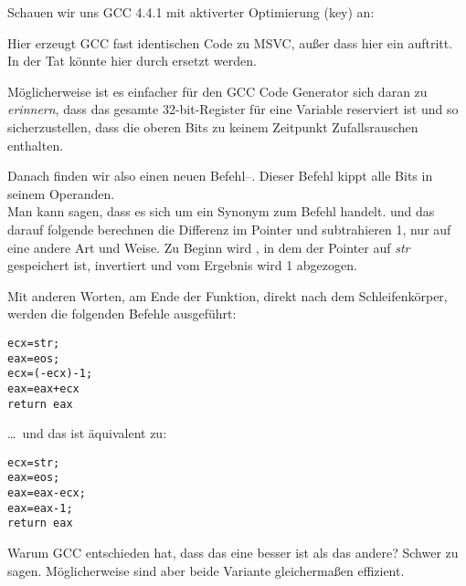 Schauen wir uns GCC 4.4.1 mit aktiverter Optimierung (\Othree key) an:


 
Hier erzeugt GCC fast identischen Code zu MSVC, außer dass hier ein \MOVZX
auftritt. 
In der Tat könnte \MOVZX hier durch  ersetzt werden.
 
Möglicherweise ist es einfacher für den GCC Code Generator sich daran zu
\emph{erinnern}, dass das gesamte 32-bit-\EDX Register für eine \Tchar Variable
reserviert ist und so sicherzustellen, dass die oberen Bits zu keinem Zeitpunkt
Zufallsrauschen enthalten.

\label{strlen_NOT_ADD}

Danach finden wir also einen neuen Befehl--\NOT. Dieser Befehl kippt alle Bits
in seinem Operanden.\\
Man kann sagen, dass es sich um ein Synonym zum Befehl 
handelt. 
\NOT und das darauf folgende \ADD berechnen die Differenz im Pointer und
subtrahieren 1, nur auf eine andere Art und Weise. 
Zu Beginn wird \ECX, in dem der Pointer auf \emph{str} gespeichert ist, invertiert
und vom Ergebnis wird 1 abgezogen.

Mit anderen Worten, am Ende der Funktion, direkt nach dem Schleifenkörper,
werden die folgenden Befehle ausgeführt:

\begin{lstlisting}[style=customc]
ecx=str;
eax=eos;
ecx=(-ecx)-1; 
eax=eax+ecx
return eax
\end{lstlisting}

\dots~und das ist äquivalent zu:

\begin{lstlisting}[style=customc]
ecx=str;
eax=eos;
eax=eax-ecx;
eax=eax-1;
return eax
\end{lstlisting}

Warum GCC entschieden hat, dass das eine besser ist als das andere? Schwer zu
sagen.
Möglicherweise sind aber beide Variante gleichermaßen effizient.
